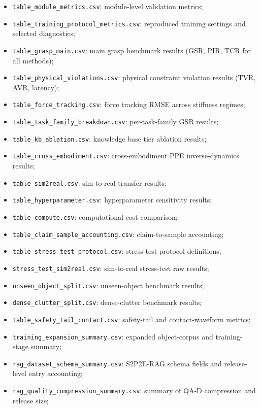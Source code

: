 \documentclass[11pt]{article}
\begin{document}
\begin{itemize}[leftmargin=1.5em]
\item \texttt{table\_module\_metrics.csv}: module-level validation metrics;
\item \texttt{table\_training\_protocol\_metrics.csv}: reproduced training settings and selected diagnostics;
\item \texttt{table\_grasp\_main.csv}: main grasp benchmark results (GSR, PIR, TCR for all methods);
\item \texttt{table\_physical\_violations.csv}: physical constraint violation results (TVR, AVR, latency);
\item \texttt{table\_force\_tracking.csv}: force tracking RMSE across stiffness regimes;
\item \texttt{table\_task\_family\_breakdown.csv}: per-task-family GSR results;
\item \texttt{table\_kb\_ablation.csv}: knowledge base tier ablation results;
\item \texttt{table\_cross\_embodiment.csv}: cross-embodiment PPE inverse-dynamics results;
\item \texttt{table\_sim2real.csv}: sim-to-real transfer results;
\item \texttt{table\_hyperparameter.csv}: hyperparameter sensitivity results;
\item \texttt{table\_compute.csv}: computational cost comparison;
\item \texttt{table\_claim\_sample\_accounting.csv}: claim-to-sample accounting;
\item \texttt{table\_stress\_test\_protocol.csv}: stress-test protocol definitions;
\item \texttt{stress\_test\_sim2real.csv}: sim-to-real stress-test raw results;
\item \texttt{unseen\_object\_split.csv}: unseen-object benchmark results;
\item \texttt{dense\_clutter\_split.csv}: dense-clutter benchmark results;
\item \texttt{table\_safety\_tail\_contact.csv}: safety-tail and contact-waveform metrics;
\item \texttt{training\_expansion\_summary.csv}: expanded object-corpus and training-stage summary;
\item \texttt{rag\_dataset\_schema\_summary.csv}: S2P2E-RAG schema fields and release-level entry accounting;
\item \texttt{rag\_quality\_compression\_summary.csv}: summary of QA-D compression and release size;

\end{itemize}
\end{document}
